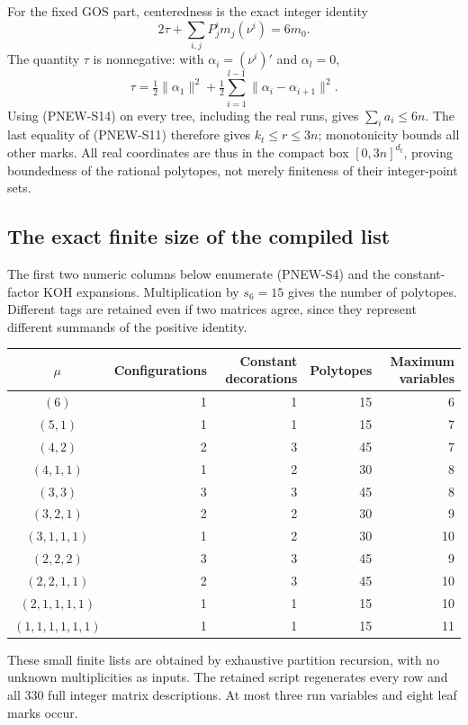 For the fixed GOS part, centeredness is the exact integer
identity
\[
 2\tau+\sum_{i,j}P_j^i m_j(\nu^i)=6m_0.
 \tag{PNEW-S15}
\]
The quantity $\tau$ is nonnegative: with
$\alpha_i=(\nu^i)'$ and $\alpha_l=0$,
\[
 \tau=\tfrac12\|\alpha_1\|^2+
             \tfrac12\sum_{i=1}^{l-1}\|\alpha_i-\alpha_{i+1}\|^2.
\]
Using (PNEW-S14) on every tree, including the real runs,
gives $\sum_i a_i\le6n$.
The last equality of (PNEW-S11) therefore gives
$k_t\le r\le3n$; monotonicity bounds all other marks.
All real coordinates are thus in the compact box
$[0,3n]^{d_t}$, proving boundedness of the rational polytopes,
not merely finiteness of their integer-point sets.

\subsection{The exact finite size of the compiled list}
The first two numeric columns below enumerate (PNEW-S4)
and the constant-factor KOH expansions.  Multiplication by
$s_6=15$ gives the number of polytopes.  Different tags
are retained even if two matrices agree, since they represent
different summands of the positive identity.
\begin{center}
\begin{tabular}{c r r r r}
\toprule
$\mu$ & Configurations & Constant decorations & Polytopes & Maximum variables\\
\midrule
$(6)$             &1&1&15&6\\
$(5,1)$           &1&1&15&7\\
$(4,2)$           &2&3&45&7\\
$(4,1,1)$         &1&2&30&8\\
$(3,3)$           &3&3&45&8\\
$(3,2,1)$         &2&2&30&9\\
$(3,1,1,1)$       &1&2&30&10\\
$(2,2,2)$         &3&3&45&9\\
$(2,2,1,1)$       &2&3&45&10\\
$(2,1,1,1,1)$     &1&1&15&10\\
$(1,1,1,1,1,1)$   &1&1&15&11\\
\bottomrule
\end{tabular}
\end{center}
These small finite lists are obtained by exhaustive partition
recursion, with no unknown multiplicities as inputs.
The retained script regenerates every row and all $330$
full integer matrix descriptions.
At most three run variables and eight leaf marks occur.

